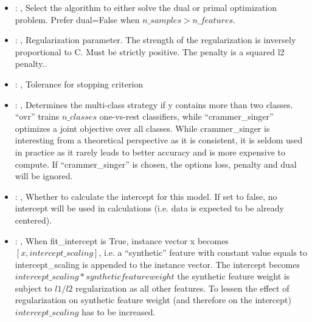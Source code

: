 \begin{itemize}
    \item {}: ,
      Select the algorithm to either solve the dual or primal optimization problem.
      Prefer dual=False when $n\_samples > n\_features$.

    \item {}: ,
      Regularization parameter. The strength of the regularization is inversely
      proportional to C.                                                            Must be strictly
      positive. The penalty is a squared l2 penalty..

    \item {}: ,
      Tolerance for stopping criterion

    \item {}: ,
      Determines the multi-class strategy if y contains more than two classes. ``ovr'' trains
      $n\_classes$ one-vs-rest classifiers, while ``crammer\_singer'' optimizes a joint objective over
      all classes.                                                  While crammer\_singer is
      interesting from a theoretical perspective as it is consistent, it is seldom used
      in practice as it rarely leads to better accuracy and is more expensive to compute. If
      ``crammer\_singer''                                                  is chosen, the options
      loss, penalty and dual will be ignored.

    \item {}: ,
      Whether to calculate the intercept for this model. If set to false, no
      intercept will be used in calculations (i.e. data is expected to be already centered).

    \item {}: ,
      When fit\_intercept is True, instance vector x becomes $[x, intercept\_scaling]$,
      i.e. a “synthetic” feature with constant value equals to intercept\_scaling is appended
      to the instance vector. The intercept becomes $intercept\_scaling * synthetic feature weight$
      \nb the synthetic feature weight is subject to $l1/l2$ regularization as all other features.
      To lessen the effect of regularization on synthetic feature weight (and therefore on the
      intercept)                                                  $intercept\_scaling$ has to be
      increased.


\end{itemize}
